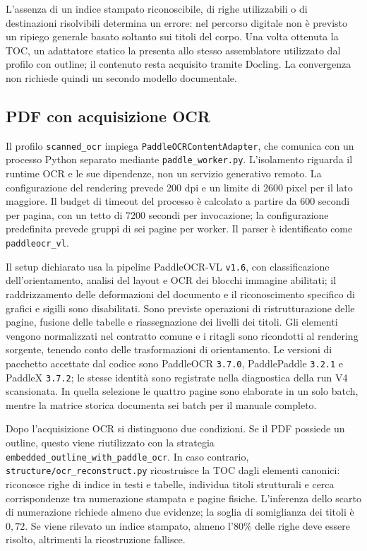 L'assenza di un indice stampato riconoscibile, di righe utilizzabili o di destinazioni risolvibili determina un errore: nel percorso digitale non è previsto un ripiego generale basato soltanto sui titoli del corpo. Una volta ottenuta la TOC, un adattatore statico la presenta allo stesso assemblatore utilizzato dal profilo con outline; il contenuto resta acquisito tramite Docling. La convergenza non richiede quindi un secondo modello documentale.

\subsection{PDF con acquisizione OCR}

Il profilo \texttt{scanned\_ocr} impiega \texttt{PaddleOCRContentAdapter}, che comunica con un processo Python separato mediante \texttt{paddle\_worker.py}. L'isolamento riguarda il runtime OCR e le sue dipendenze, non un servizio generativo remoto. La configurazione del rendering prevede 200 dpi e un limite di 2600 pixel per il lato maggiore. Il budget di timeout del processo è calcolato a partire da 600 secondi per pagina, con un tetto di 7200 secondi per invocazione; la configurazione predefinita prevede gruppi di sei pagine per worker. Il parser è identificato come \texttt{paddleocr\_vl}.

Il setup dichiarato usa la pipeline PaddleOCR-VL \texttt{v1.6}, con classificazione dell'orientamento, analisi del layout e OCR dei blocchi immagine abilitati; il raddrizzamento delle deformazioni del documento e il riconoscimento specifico di grafici e sigilli sono disabilitati. Sono previste operazioni di ristrutturazione delle pagine, fusione delle tabelle e riassegnazione dei livelli dei titoli. Gli elementi vengono normalizzati nel contratto comune e i ritagli sono ricondotti al rendering sorgente, tenendo conto delle trasformazioni di orientamento. Le versioni di pacchetto accettate dal codice sono PaddleOCR \texttt{3.7.0}, PaddlePaddle \texttt{3.2.1} e PaddleX \texttt{3.7.2}; le stesse identità sono registrate nella diagnostica della run V4 scansionata. In quella selezione le quattro pagine sono elaborate in un solo batch, mentre la matrice storica documenta sei batch per il manuale completo.

Dopo l'acquisizione OCR si distinguono due condizioni. Se il PDF possiede un outline, questo viene riutilizzato con la strategia \texttt{embedded\_outline\_with\_paddle\_ocr}. In caso contrario, \texttt{structure/ocr\_reconstruct.py} ricostruisce la TOC dagli elementi canonici: riconosce righe di indice in testi e tabelle, individua titoli strutturali e cerca corrispondenze tra numerazione stampata e pagine fisiche. L'inferenza dello scarto di numerazione richiede almeno due evidenze; la soglia di somiglianza dei titoli è $0{,}72$. Se viene rilevato un indice stampato, almeno l'80\% delle righe deve essere risolto, altrimenti la ricostruzione fallisce.

